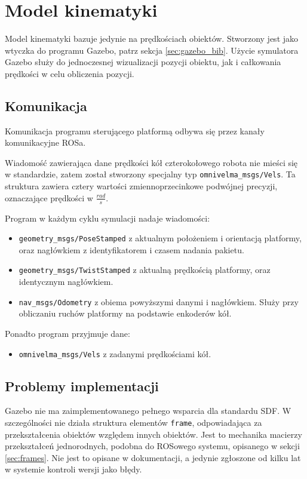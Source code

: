 \section{Model kinematyki}
	Model kinematyki bazuje jedynie na prędkościach obiektów.
	Stworzony jest jako wtyczka do programu Gazebo, patrz sekcja \ref{sec:gazebo_bib}.
	Użycie symulatora Gazebo służy do jednoczesnej wizualizacji pozycji obiektu, jak i całkowania prędkości w celu obliczenia pozycji.
	
	\subsection{Komunikacja}
		Komunikacja programu sterującego platformą odbywa się przez kanały komunikacyjne ROSa.

		Wiadomość zawierająca dane prędkości kół czterokołowego robota nie mieści się w standardzie, zatem został stworzony specjalny typ \texttt{omnivelma\_msgs/Vels}.
		Ta struktura zawiera cztery wartości zmiennoprzecinkowe podwójnej precyzji, oznaczające prędkości w $\frac{rad}{s}$.

		Program w każdym cyklu symulacji nadaje wiadomości:
		\begin{itemize}
		\item \texttt{geometry\_msgs/PoseStamped} z aktualnym położeniem i orientacją platformy, oraz nagłówkiem z identyfikatorem i czasem nadania pakietu.
		\item \texttt{geometry\_msgs/TwistStamped} z aktualną prędkością platformy, oraz identycznym nagłówkiem.
		\item \texttt{nav\_msgs/Odometry} z obiema powyższymi danymi i nagłówkiem. Służy przy obliczaniu ruchów platformy na podstawie enkoderów kół.
		\end{itemize}
		Ponadto program przyjmuje dane:
		\begin{itemize}
		\item \texttt{omnivelma\_msgs/Vels} z zadanymi prędkościami kół.
		\end{itemize}
	
	\subsection{Problemy implementacji}
		Gazebo nie ma zaimplementowanego pełnego wsparcia dla standardu SDF.
		W szczególności nie działa struktura elementów \texttt{frame}, odpowiadająca za przekształcenia obiektów względem innych obiektów.
		Jest to mechanika macierzy przekształceń jednorodnych, podobna do ROSowego systemu, opisanego w sekcji \ref{sec:frames}.
		Nie jest to opisane w dokumentacji, a jedynie zgłoszone od kilku lat w systemie kontroli wersji jako błędy.

